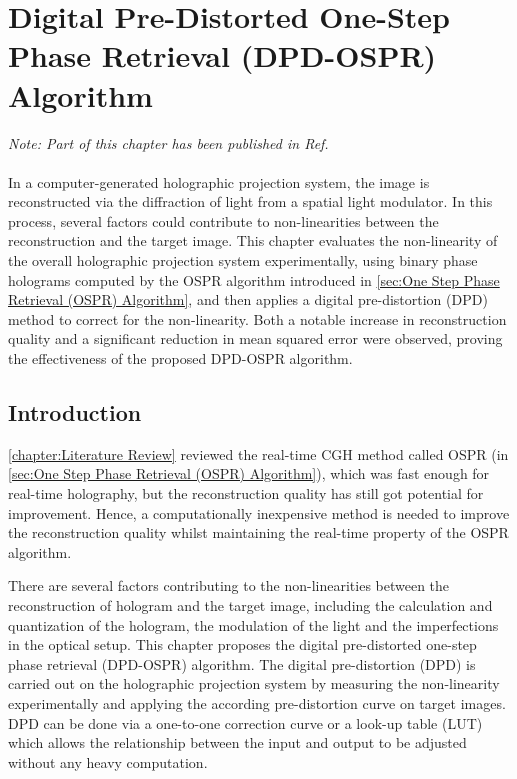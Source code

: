 \chapter{Digital Pre-Distorted One-Step Phase Retrieval (DPD-OSPR) Algorithm} \label{chapter:Digital Pre-Distorted One-Step Phase Retrieval (DPD-OSPR) Algorithm}

\graphicspath{{Chapter_DPD_OSPR/Figs/}}

\textit{Note: Part of this chapter has been published in Ref. \cite{Sha2023DPD}}\\\\

In a computer-generated holographic projection system, the image is reconstructed via the diffraction of light from a spatial light modulator. In this process, several factors could contribute to non-linearities between the reconstruction and the target image. This chapter evaluates the non-linearity of the overall holographic projection system experimentally, using binary phase holograms computed by the OSPR algorithm introduced in \cref{sec:One Step Phase Retrieval (OSPR) Algorithm}, and then applies a digital pre-distortion (DPD) method to correct for the non-linearity. Both a notable increase in reconstruction quality and a significant reduction in mean squared error were observed, proving the effectiveness of the proposed DPD-OSPR algorithm.


\section{Introduction}
\cref{chapter:Literature Review} reviewed the real-time CGH method called OSPR (in \cref{sec:One Step Phase Retrieval (OSPR) Algorithm}), which was fast enough for real-time holography, but the reconstruction quality has still got potential for improvement. Hence, a computationally inexpensive method is needed to improve the reconstruction quality whilst maintaining the real-time property of the OSPR algorithm.

There are several factors contributing to the non-linearities between the reconstruction of hologram and the target image, including the calculation and quantization of the hologram, the modulation of the light and the imperfections in the optical setup. This chapter proposes the digital pre-distorted one-step phase retrieval (DPD-OSPR) algorithm. The digital pre-distortion (DPD) is carried out on the holographic projection system by measuring the non-linearity experimentally and applying the according pre-distortion curve on target images. DPD can be done via a one-to-one correction curve or a look-up table (LUT) which allows the relationship between the input and output to be adjusted without any heavy computation.

